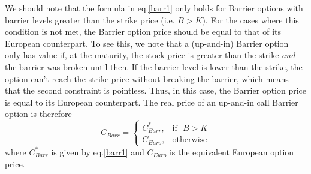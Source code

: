 We should note that the formula in eq.\eqref{barr1} only holds for Barrier options with barrier levels greater than the strike price (i.e. $B>K$).
For the cases where this condition is not met, the Barrier option price should be equal to that of its European counterpart. To see this, we note that a (up-and-in) Barrier option only has value if, at the maturity, the stock price is greater than the strike \emph{and} the barrier was broken until then. If the barrier level is lower than the strike, the option can't reach the strike price without breaking the barrier, which means that the second constraint is pointless. Thus, in this case, the Barrier option price is equal to its European counterpart.
The real price of an up-and-in call Barrier option is therefore
\begin{equation}\label{barr2}
C_{Barr}=\begin{cases} 
      C_{Barr}^*, & \mathrm{if}\ \ \ B>K\\
      C_{Euro}, & \mathrm{otherwise}
   \end{cases}
\end{equation}
\noindent where $C_{Barr}^*$ is given by eq.\eqref{barr1} and $C_{Euro}$ is the equivalent European option price.

